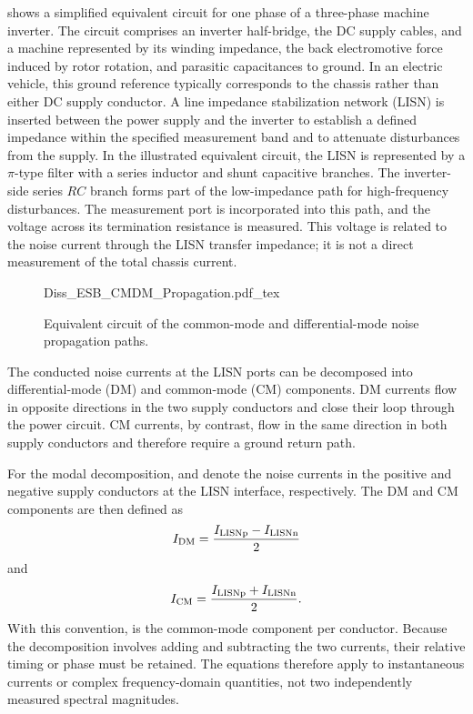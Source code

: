  shows a simplified equivalent circuit for one phase of a three-phase machine inverter.
The circuit comprises an inverter half-bridge, the DC supply cables, and a machine represented by its winding impedance, the back electromotive force induced by rotor rotation, and parasitic capacitances to ground.
In an electric vehicle, this ground reference typically corresponds to the chassis rather than either DC supply conductor.
A line impedance stabilization network (LISN) is inserted between the power supply and the inverter to establish a defined impedance within the specified measurement band and to attenuate disturbances from the supply.
In the illustrated equivalent circuit, the LISN is represented by a $\pi$-type filter with a series inductor and shunt capacitive branches.
The inverter-side series $RC$ branch forms part of the low-impedance path for high-frequency disturbances. 
The measurement port is incorporated into this path, and the voltage across its termination resistance is measured.
This voltage is related to the noise current through the LISN transfer impedance; it is not a direct measurement of the total chassis current.

\begin{figure}[h]
	\centering
	{Diss_ESB_CMDM_Propagation.pdf_tex}
	\caption{Equivalent circuit of the common-mode and differential-mode noise propagation paths.}
	\label{fig:ESB_CMDM_Propagation}
\end{figure}

The conducted noise currents at the LISN ports can be decomposed into differential-mode (DM) and common-mode (CM) components.
DM currents flow in opposite directions in the two supply conductors and close their loop through the power circuit.
CM currents, by contrast, flow in the same direction in both supply conductors and therefore require a ground return path. 


For the modal decomposition,  and  denote the noise currents in the positive and negative supply conductors at the LISN interface, respectively. 
The DM and CM components are then defined as
\begin{equation}
	{I}_{\mathrm{DM}} = \frac{{I}_{\mathrm{LISNp}} - {I}_{\mathrm{LISNn}}}{2}
\end{equation}
and
\begin{equation}
	{I}_{\mathrm{CM}} = \frac{{I}_{\mathrm{LISNp}} + {I}_{\mathrm{LISNn}}}{2}.
\end{equation}
With this convention,  is the common-mode component per conductor.
Because the decomposition involves adding and subtracting the two currents, their relative timing or phase must be retained.
The equations therefore apply to instantaneous currents or complex frequency-domain quantities, not two independently measured spectral magnitudes.


